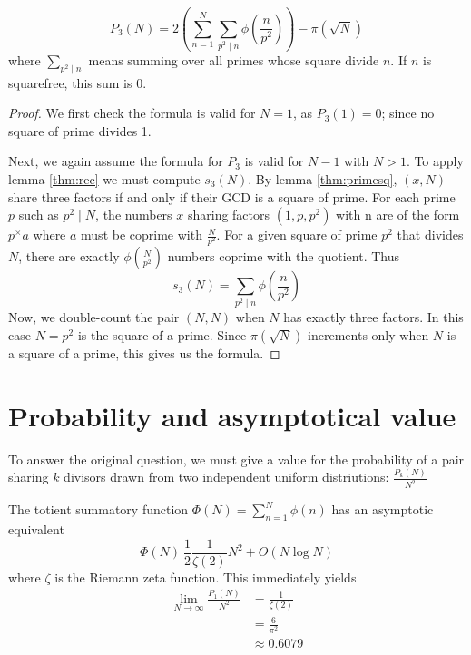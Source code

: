 \documentclass[a4paper, 10pt]{article}
\numberwithin{equation}{section} %
\begin{document}
\begin{thm}
\[
    P_3(N) = 2\left(\sum_{n=1}^N \sum_{p^2 \mid n}\phi(\frac{n}{p^2})\right) - \pi(\sqrt{N})
\]
where $\sum_{p^2 \mid n}$ means summing over all primes whose square divide $n$.
If $n$ is squarefree, this sum is 0.
\end{thm}
\begin{proof}
 We first check the formula is valid for $N=1$, as $P_3(1) = 0$; since no square of prime divides 1.

Next, we again assume the formula for $P_3$ is valid for $N-1$ with $N>1$.
To apply lemma \ref{thm:rec} we must compute $s_3(N)$.
By lemma \ref{thm:primesq}, $(x,N)$ share three factors if and only if their GCD is
a square of prime.
For each prime $p$ such as $p^2 \mid N$, the numbers $x$ sharing factors $(1,p,p^2)$ with n
are of the form $p^ \times a$ where $a$ must be coprime with $\frac{N}{p^2}$.
For a given square of prime $p^2$ that divides $N$, there are exactly
$\phi(\frac{N}{p^2})$ numbers coprime with the quotient.
Thus
\[
    s_3(N) = \sum_{p^2 \mid n}\phi(\frac{n}{p^2})
\]
Now,  we double-count the pair $(N,N)$ when $N$ has exactly three factors.
In this case $N = p^2$ is the square of a prime.
Since $\pi(\sqrt{N})$ increments only when $N$ is a square of a prime,
this gives us the formula.
\end{proof}

\section*{Probability and asymptotical value}

To answer the original question, we must give a value for
the probability of a pair sharing $k$ divisors drawn from two
independent uniform distriutions: $\frac{P_k(N)}{N^2}$

The totient summatory function $\Phi(N) = \sum_{n=1}^N \phi(n)$
has an asymptotic equivalent \cite{totsum}
\[\Phi(N) ~ \frac{1}{2} \frac{1}{\zeta(2)} N^2  + O(N \log N )\]
where $\zeta$ is the Riemann zeta function.
This immediately yields
\begin{align*}
    \lim_{N \rightarrow \infty} \frac{P_1(N)}{N^2}
    &=  \frac{1}{\zeta(2)} \\
    &=  \frac{6}{\pi^2} \\
    &\approx 0.6079
\end{align*}

\printbibliography
\end{document}
